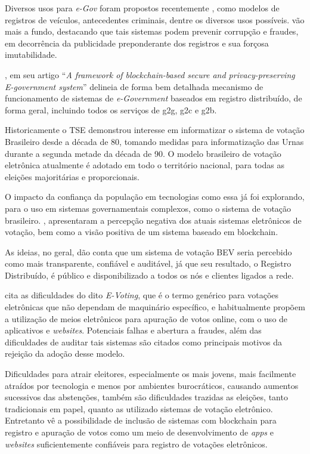 Diversos usos para \textit{e-Gov} foram propostos recentemente \cite{Olnes2017}, como modelos de registros de veículos, antecedentes criminais, dentre os diversos usos possíveis.  vão mais a fundo, destacando que tais sistemas podem prevenir corrupção e fraudes, em decorrência da publicidade preponderante dos registros e sua forçosa imutabilidade. 

, em seu artigo “\textit{A framework of blockchain-based secure and privacy-preserving E-government system}” delineia de forma bem detalhada mecanismo de funcionamento de sistemas de \textit{e-Government} baseados em registro distribuído, de forma geral, incluindo todos os serviços de \gls{g2g}, \gls{g2c} e \gls{g2b}. 

Historicamente o TSE \cite{Brasil2014} demonstrou interesse em informatizar o sistema de votação Brasileiro desde a década de 80, tomando medidas para informatização das Urnas durante a segunda metade da década de 90. O modelo brasileiro de votação eletrônica atualmente é adotado em todo o território nacional, para todas as eleições majoritárias e proporcionais.    

O impacto da confiança da população em tecnologias como essa já foi explorando, para o uso em sistemas governamentais complexos, como o sistema de votação brasileiro. , apresentaram a percepção negativa dos atuais sistemas eletrônicos de votação, bem como a visão positiva de um sistema baseado em blockchain.  

As ideias, no geral, dão conta que um sistema de votação BEV seria percebido como mais transparente, confiável e auditável, já que seu resultado, o Registro Distribuído, é público e disponibilizado a todos os nós e clientes ligados a rede.  

 cita as dificuldades do dito \textit{E-Voting}, que é o termo genérico para votações eletrônicas que não dependam de maquinário específico, e habitualmente propõem a utilização de meios eletrônicos para apuração de votos online, com o uso de aplicativos e \textit{websites}. Potenciais falhas e abertura a fraudes, além das dificuldades de auditar tais sistemas são citados como principais motivos da rejeição da adoção desse modelo.  

Dificuldades para atrair eleitores, especialmente os mais jovens, mais facilmente atraídos por tecnologia e menos por ambientes burocráticos, causando aumentos sucessivos das abstenções, também são dificuldades trazidas as eleições, tanto tradicionais em papel, quanto as utilizado sistemas de votação eletrônico. Entretanto vê a possibilidade de inclusão de sistemas com blockchain para registro e apuração de votos como um meio de desenvolvimento de \textit{apps} e \textit{websites} suficientemente confiáveis para registro de votações eletrônicos.

